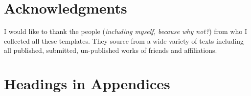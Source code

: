 \documentclass{sig-alternate-05-2015}
\begin{document}
  
\section{Acknowledgments}
I would like to thank the people (\textit{including myself, because why not?}) from who I collected all these templates. They source from a wide variety of texts including all published, submitted, un-published works of friends and affiliations. 


\appendix

\section{Headings in Appendices}
\end{document}
